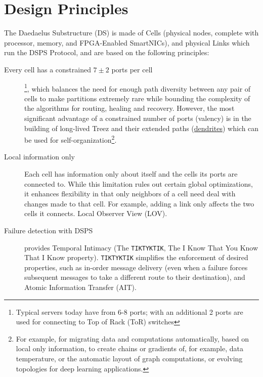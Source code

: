 \documentclass[../../../OAE-SPEC-MAIN.tex]{subfiles}
\begin{document}
\section{Design Principles}

The Daedaelus Substructure (DS) is made of Cells (physical nodes, complete with processor, memory, and FPGA-Enabled SmartNICs), and physical Links which run the DSPS Protocol, and are based on the following principles:

\begin{description}

	\item [Every cell has a constrained $7 \pm 2$ ports per cell]\footnote{Typical servers today have from 6-8 ports; with an additional 2 ports are used for connecting to Top of Rack (ToR) switches}, %
	which balances the need for enough path diversity between any pair of cells to make partitions extremely rare while bounding the complexity of the algorithms for routing, healing and recovery.  However, the most significant advantage of a constrained number of ports (valency) is in the building of long-lived Treez and their extended paths (\href{https://en.wikipedia.org/wiki/Dendrite}{dendrites}) which can be used for self-organization\footnote{For example, for migrating data and computations automatically, based on local only information, to create chains or gradients of, for example, data temperature, or the automatic layout of graph computations, or evolving topologies for deep learning applications.}. 

	\item [Local information only] Each cell has information only about itself and the cells its ports are connected to.  While this limitation rules out certain global optimizations, it enhances flexibility in that only neighbors of a cell need deal with changes made to that cell.  For example, adding a link only affects the two cells it connects. Local Observer View (LOV).

	\item [Failure detection with DSPS]  provides Temporal Intimacy (The \texttt{TIK\hspace{1pt}TYK\hspace{1pt}TIK}, The I Know That You Know That I Know property).   \texttt{TIK\hspace{1pt}TYK\hspace{1pt}TIK} simplifies the enforcement of desired properties, such as in-order message delivery (even when a failure forces subsequent messages to take a different route to their destination), and Atomic Information Transfer (AIT).


\end{description}
\end{document}
